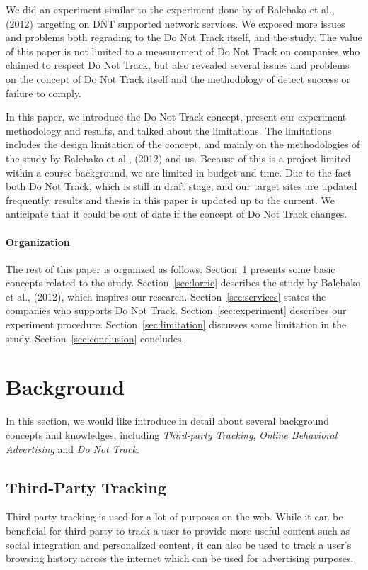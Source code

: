 \documentclass{sig-alternate}
\begin{document}
We did an experiment similar to the experiment done by of Balebako et al., (2012) targeting on DNT supported network services. We exposed more issues and problems both regrading to the Do Not Track itself, and the study. The value of this paper is not limited to a measurement of Do Not Track on companies who claimed to respect Do Not Track, but also revealed several issues and problems on the concept of Do Not Track itself and the methodology of detect success or failure to comply.

In this paper, we introduce the Do Not Track concept, present our experiment methodology and results, and talked about the limitations. The limitations includes the design limitation of the concept, and mainly on the methodologies of the study by Balebako et al., (2012) and us. Because of this is a project limited within a course background, we are limited in budget and time. Due to the fact both Do Not Track, which is still in draft stage, and our target sites are updated frequently, results and thesis in this paper is updated up to the current. We anticipate that it could be out of date if the concept of Do Not Track changes.

\paragraph{Organization}
The rest of this paper is organized as follows. Section~\ref{sec:background} presents some basic concepts related to the study.  Section~\ref{sec:lorrie} describes the study by Balebako et al., (2012), which inspires our research. Section~\ref{sec:services} states the companies who supports Do Not Track. Section~\ref{sec:experiment} describes our experiment procedure. Section~\ref{sec:limitation} discusses some limitation in the study. Section~\ref{sec:conclusion} concludes.

\section{Background} \label{sec:background}

In this section, we would like introduce in detail about several background concepts and knowledges, including \emph{Third-party Tracking}, \emph{Online Behavioral Advertising} and \emph{Do Not Track}. 
\subsection*{Third-Party Tracking}

Third-party tracking is used for a lot of purposes on the web. While it can be beneficial for third-party to track a user to provide more useful content such as social integration and personalized content, it can also be used to track a user's browsing history across the internet which can be used for advertising purposes. 
\end{document}
